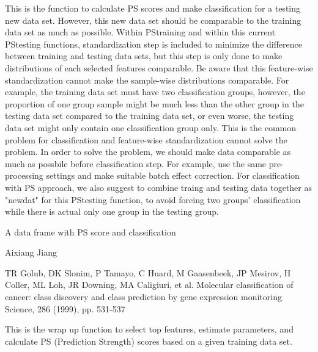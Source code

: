 \documentclass[letterpaper]{book}
\begin{document}
\begin{Details}\relax
This is the function to calculate PS scores and make classification for a testing new data set. 
However, this new data set should be comparable to the training data set as much as possible. 
Within PStraining and within this current PStesting functions, standardization step is included
to minimize the difference between training and testing data sets, but this step is only done to
make distributions of each selected features comparable. Be aware that this feature-wise 
standardization cannot make the sample-wise distributions comparable. 
For example, the training data set must have two classification groups, however, the proportion of 
one group sample might be much less than the other group in the testing data set compared to the 
training data set, or even worse, the testing data set might only contain one classification group only. 
This is the common problem for classification and feature-wise standardization cannot solve the problem. 
In order to solve the problem, we should make data comparable as much as possbile before classification step.
For example, use the same pre-processing settings and make suitable batch effect correction. 
For classification with PS approach, we also suggest to combine traing and testing data together as "newdat"
for this PStesting function, to avoid forcing two groups' classification while there is actual only one group
in the testing group.
\end{Details}
%
\begin{Value}
A data frame with PS score and classification
\end{Value}
%
\begin{Author}\relax
Aixiang Jiang
\end{Author}
%
\begin{References}\relax
TR Golub, DK Slonim, P Tamayo, C Huard, M Gaasenbeek, JP Mesirov, H Coller, ML Loh, JR Downing, MA Caligiuri, et al.
Molecular classification of cancer: class discovery and class prediction by gene expression monitoring
Science, 286 (1999), pp. 531-537
\end{References}
%
\begin{Description}\relax
This is the wrap up function to select top features, estimate parameters, 
and calculate PS (Prediction Strength) scores based on a given training data set.
\end{Description}
\end{document}
